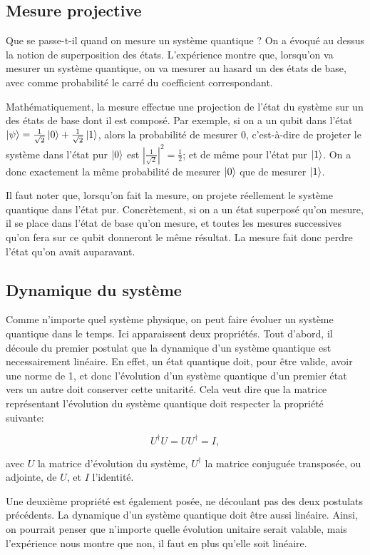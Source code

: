 \subsection{Mesure projective}
Que se passe-t-il quand on mesure un système quantique ? On a évoqué au dessus la notion de superposition des états. L'expérience montre que, lorsqu'on va mesurer un système quantique, on va mesurer au hasard un des états de base, avec comme probabilité le carré du coefficient correspondant.

Mathématiquement, la mesure effectue une projection de l'état du système sur un des états de base dont il est composé. Par exemple, si on a un qubit dans l'état $\ket{\psi} = \frac{1}{\sqrt{2}}\ket{0} + \frac{1}{\sqrt{2}}\ket{1}$, alors la probabilité de mesurer 0, c'est-à-dire de projeter le système dans l'état pur $\ket{0}$ est $|\frac{1}{\sqrt{2}}|^2 = \frac{1}{2}$; et de même pour l'état pur $\ket{1}$. On a donc exactement la même probabilité de mesurer $\ket{0}$ que de mesurer $\ket{1}$.

Il faut noter que, lorsqu'on fait la mesure, on projete réellement le système quantique dans l'état pur. Concrètement, si on a un état superposé qu'on mesure, il se place dans l'état de base qu'on mesure, et toutes les mesures successives qu'on fera sur ce qubit donneront le même résultat. La mesure fait donc perdre l'état qu'on avait auparavant.

\subsection{Dynamique du système}
Comme n'importe quel système physique, on peut faire évoluer un système quantique dans le temps. Ici apparaissent deux propriétés. Tout d'abord, il découle du premier postulat que la dynamique d'un système quantique est necessairement linéaire. En effet, un état quantique doit, pour être valide, avoir une norme de 1, et donc l'évolution d'un système quantique d'un premier état vers un autre doit conserver cette unitarité. Cela veut dire que la matrice représentant l'évolution du système quantique doit respecter la propriété suivante:

\begin{equation}
    U^{\dagger}U = UU^{\dagger} = I,
\end{equation}

avec $U$ la matrice d'évolution du système, $U^{\dagger}$ la matrice conjuguée transposée, ou adjointe, de $U$, et $I$ l'identité.

Une deuxième propriété est également posée, ne découlant pas des deux postulats précédents. La dynamique d'un système quantique doit être aussi linéaire. Ainsi, on pourrait penser que n'importe quelle évolution unitaire serait valable, mais l'expérience nous montre que non, il faut en plus qu'elle soit linéaire.

